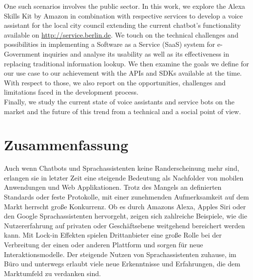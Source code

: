 One such scenarios involves the public sector. In this work, we explore the Alexa Skills Kit by Amazon in combination with respective services to develop a voice assistant for the local city council extending the current chatbot's functionality available on \href{ https://service.berlin.de/virtueller-assistent/virtueller-assistent-606279.php}{http://service.berlin.de}. We touch on the technical challenges and possibilities in implementing a Software as a Service (SaaS) system for e-Government inquiries and analyse its usability as well as its effectiveness in replacing traditional information lookup. We then examine the goals we define for our use case to our achievement with the APIs and SDKs available at the time. With respect to those, we also report on the opportunities, challenges and limitations faced in the development process.\\

Finally, we study the current state of voice assistants and service bots on the market and the future of this trend from a technical and a social point of view.




\newpage
\chapter*{Zusammenfassung}

Auch wenn Chatbots und Sprachassistenten keine Randerscheinung mehr sind, erlangen sie in letzter Zeit eine steigende Bedeutung als Nachfolder von mobilen Anwendungen und Web Applikationen. Trotz des Mangels an definierten Standards oder feste Protokolle, mit einer zunehmenden Aufmerksamkeit auf dem Markt herrscht große Konkurrenz. Ob es durch Amazons Alexa, Apples Siri oder den Google Sprachassistenten hervorgeht, zeigen sich zahlreiche Beispiele, wie die Nutzererfahrung auf privaten oder Geschäftsebene weitgehend bereichert werden kann. Mit Lock-in Effekten spielen Drittanbieter eine große Rolle bei der Verbreitung der einen oder anderen Plattform und sorgen für neue Interaktionsmodelle. Der steigende Nutzen von Sprachassistenten zuhause, im Büro und unterwegs erlaubt viele neue Erkenntnisse und Erfahrungen, die dem Marktumfeld zu verdanken sind. \\


